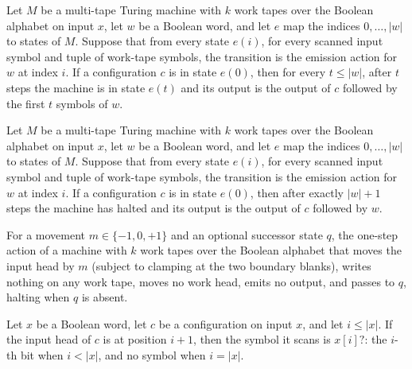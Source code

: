 \begin{lemma}
\label{Turing.FinTM.emit_run}
\leanok
{}
Let $M$ be a multi-tape Turing machine with $k$ work tapes over the Boolean alphabet on
input $x$, let $w$ be a Boolean word, and let $e$ map the indices $0,\ldots,|w|$ to
states of $M$. Suppose that from every state $e(i)$, for every scanned input symbol and
tuple of work-tape symbols, the transition is the emission action for $w$ at index $i$.
If a configuration $c$ is in state $e(0)$, then for every $t\le |w|$, after $t$ steps
the machine is in state $e(t)$ and its output is the output of $c$ followed by the first
$t$ symbols of $w$.
\end{lemma}

\begin{lemma}
\label{Turing.FinTM.emit_halts}
\leanok
{}
Let $M$ be a multi-tape Turing machine with $k$ work tapes over the Boolean alphabet on
input $x$, let $w$ be a Boolean word, and let $e$ map the indices $0,\ldots,|w|$ to
states of $M$. Suppose that from every state $e(i)$, for every scanned input symbol and
tuple of work-tape symbols, the transition is the emission action for $w$ at index $i$.
If a configuration $c$ is in state $e(0)$, then after exactly $|w|+1$ steps the machine
has halted and its output is the output of $c$ followed by $w$.
\end{lemma}

\begin{definition}
\label{Turing.FinTM.controlAction}
\leanok
{}
For a movement $m \in \{-1, 0, +1\}$ and an optional successor state $q$, the
one-step action of a machine with $k$ work tapes over the Boolean alphabet
that moves the input head by $m$ (subject to clamping at the two boundary
blanks), writes nothing on any work tape, moves no work head, emits no
output, and passes to $q$, halting when $q$ is absent.
\end{definition}

\begin{lemma}
\label{Turing.FinTM.inputSymbol_at}
\leanok
{}
Let $x$ be a Boolean word, let $c$ be a configuration on input $x$, and let $i\le |x|$.
If the input head of $c$ is at position $i+1$, then the symbol it scans is $x[i]?$: the
$i$-th bit when $i<|x|$, and no symbol when $i=|x|$.
\end{lemma}


